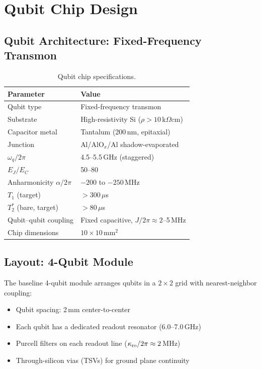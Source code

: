 \documentclass[11pt,letterpaper]{article}
\begin{document}
\section{Qubit Chip Design}

\subsection{Qubit Architecture: Fixed-Frequency Transmon}

\begin{table}[H]
\caption{Qubit chip specifications.}
\begin{tabular}{ll}
\toprule
\textbf{Parameter} & \textbf{Value} \\
\midrule
Qubit type & Fixed-frequency transmon \\
Substrate & High-resistivity Si ($\rho > 10$\,k$\Omega$cm) \\
Capacitor metal & Tantalum (200\,nm, epitaxial) \\
Junction & Al/AlO$_x$/Al shadow-evaporated \\
$\omega_q/2\pi$ & 4.5--5.5\,GHz (staggered) \\
$E_J/E_C$ & 50--80 \\
Anharmonicity $\alpha/2\pi$ & $-200$ to $-250$\,MHz \\
$T_1$ (target) & $>300\,\mu$s \\
$T_2^*$ (bare, target) & $>80\,\mu$s \\
Qubit--qubit coupling & Fixed capacitive, $J/2\pi \approx 2$--5\,MHz \\
Chip dimensions & $10 \times 10$\,mm$^2$ \\
\bottomrule
\end{tabular}
\end{table}

\subsection{Layout: 4-Qubit Module}

The baseline 4-qubit module arranges qubits in a $2 \times 2$ grid with
nearest-neighbor coupling:
\begin{itemize}
\item Qubit spacing: 2\,mm center-to-center
\item Each qubit has a dedicated readout resonator (6.0--7.0\,GHz)
\item Purcell filters on each readout line ($\kappa_{\rm ro}/2\pi
\approx 2$\,MHz)
\item Through-silicon vias (TSVs) for ground plane continuity
\end{itemize}
\end{document}
